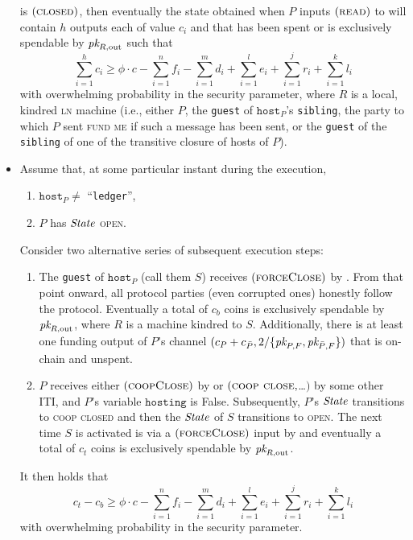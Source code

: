 \begin{lemma}
\begin{itemize}
    is $(\textsc{closed})$, then eventually the state obtained when $P$ inputs
    $(\textsc{read})$ to \ledger will contain $h$ outputs each of value $c_i$
    and that has been spent or is exclusively spendable by $\textit{pk}_{R,
    \mathrm{out}}$ such that
    \begin{equation}
    \label{lemma:real-balance-security:ineq}
      \sum\limits_{i=1}^h c_i \geq \phi \cdot c - \sum\limits_{i=1}^n f_i -
      \sum\limits_{i=1}^m d_i + \sum\limits_{i=1}^l e_i + \sum\limits_{i=1}^j
      r_i + \sum\limits_{i=1}^k l_i
    \end{equation}
    with overwhelming probability in the security parameter, where $R$ is a
    local, kindred \textsc{ln} machine (i.e., either $P$, the \texttt{guest} of
    $\texttt{host}_P$'s \texttt{sibling}, the party to which $P$ sent
    \textsc{fund me} if such a message has been sent, or the \texttt{guest} of
    the \texttt{sibling} of one of the transitive closure of hosts of $P$).
    \item Assume that, at some particular instant during the execution,
    \begin{enumerate}
      \item $\texttt{host}_P \neq$ ``\texttt{ledger}'',
      \item $P$ has $\itistate$ \textsc{open}.
    \end{enumerate}
    Consider two alternative series of subsequent execution steps:
    \begin{enumerate}
      \item The \texttt{guest} of $\texttt{host}_P$ (call them $S$) receives
      $(\textsc{forceClose})$ by \environment. From that point onward, all
      protocol parties (even corrupted ones) honestly follow the protocol.
      Eventually a total of $c_b$ coins is exclusively spendable by $\textit{pk}_{R,
      \mathrm{out}}$, where $R$ is a machine kindred to $S$. Additionally, there
      is at least one funding output of $P$'s channel $(c_P + c_{\bar{P}},
      2/\{\textit{pk}_{P, F}, \textit{pk}_{\bar{P}, F}\})$ that is on-chain and unspent.
      \item $P$ receives either $(\textsc{coopClose})$ by \environment or
      $(\textsc{coop close}, $\dots$)$ by some other ITI, and $P$'s variable
      $\texttt{hosting}$ is False. Subsequently, $P$'s $\itistate$ transitions
      to \textsc{coop closed} and then the $\itistate$ of $S$ transitions to
      \textsc{open}. The next time $S$ is activated is via a
      $(\textsc{forceClose})$ input by \environment and eventually a total of
      $c_t$ coins is exclusively spendable by $\textit{pk}_{R, \mathrm{out}}$.
    \end{enumerate}
    It then holds that
    \begin{equation}
      \label{eq:real-balance-coop-close}
      c_t - c_b \geq \phi \cdot c - \sum\limits_{i=1}^n f_i -
      \sum\limits_{i=1}^m d_i + \sum\limits_{i=1}^l e_i + \sum\limits_{i=1}^j
      r_i + \sum\limits_{i=1}^k l_i
    \end{equation}
    with overwhelming probability in the security parameter.
  \end{itemize}
\end{lemma}

